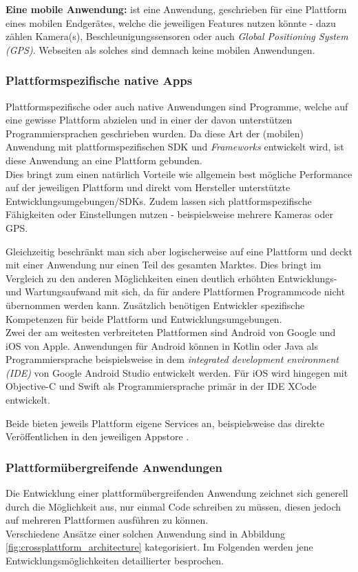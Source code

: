 \noindent
{}
\textbf{Eine mobile Anwendung:} ist eine Anwendung, geschrieben für eine Plattform eines mobilen Endgerätes, welche die jeweiligen Features nutzen könnte - dazu zählen Kamera(s), Beschleunigungssensoren oder auch \textit{Global Positioning System (GPS)}. Webseiten als solches sind demnach keine mobilen Anwendungen.


\subsubsection{Plattformspezifische native Apps}
Plattformspezifische oder auch native Anwendungen sind Programme, welche auf eine gewisse Plattform abzielen und in einer der davon unterstützen Programmiersprachen geschrieben wurden. Da diese Art der (mobilen) Anwendung mit plattformspezifischen  SDK und \textit{Frameworks} entwickelt wird, ist diese Anwendung an eine Plattform gebunden. \\
Dies bringt zum einen natürlich Vorteile wie allgemein best mögliche Performance auf der jeweiligen Plattform und direkt vom Hersteller unterstützte Entwicklungsumgebungen/SDKs.
Zudem lassen sich plattformspezifische Fähigkeiten oder Einstellungen nutzen - beispielsweise mehrere Kameras oder GPS.

\noindent
Gleichzeitig beschränkt man sich aber logischerweise auf eine Plattform und deckt mit einer Anwendung nur einen Teil des gesamten Marktes. Dies bringt im Vergleich zu den anderen Möglichkeiten einen deutlich erhöhten Entwicklungs- und Wartungsaufwand mit sich, da für andere Plattformen Programmcode nicht übernommen werden kann. Zusätzlich benötigen Entwickler spezifische Kompetenzen für beide Plattform und Entwicklungsumgebungen. \\

\noindent
Zwei der am weitesten verbreiteten Plattformen sind Android von Google und iOS von Apple. Anwendungen für Android können in Kotlin oder Java als Programmiersprache beispielsweise in dem \textit{integrated development environment (IDE)} von Google Android Studio entwickelt werden. Für iOS wird hingegen mit Objective-C und Swift als Programmiersprache primär in der IDE XCode entwickelt.

\noindent
Beide bieten jeweils Plattform eigene Services an, beispielsweise das direkte Veröffentlichen in den jeweiligen Appstore \cite{fentaw2020}.

\subsubsection{Plattformübergreifende Anwendungen}
\label{plattformuebergreifende_anwendungen}
Die Entwicklung einer plattformübergreifenden Anwendung zeichnet sich generell durch die Möglichkeit aus, nur einmal Code schreiben zu müssen, diesen jedoch auf mehreren Plattformen ausführen zu können. \\
Verschiedene Ansätze einer solchen Anwendung sind in Abbildung \ref{fig:crossplattform_architecture} kategorisiert. Im Folgenden werden jene Entwicklungsmöglichkeiten detaillierter besprochen.


